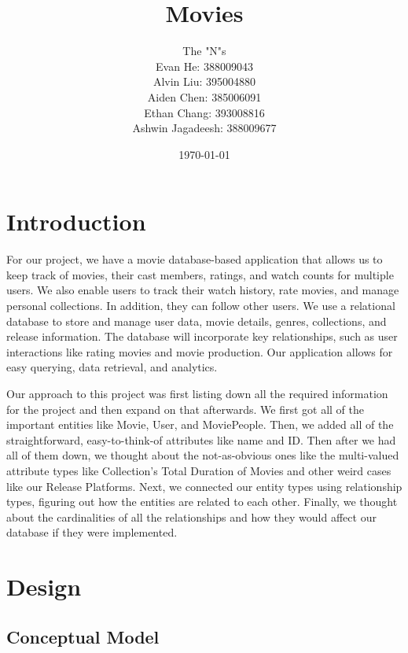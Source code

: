 \documentclass[12pt]{article}
\title{Movies}
\date{\today}
\author{The "N"s \\
        Evan He: 388009043\\
        Alvin Liu: 395004880\\
        Aiden Chen: 385006091\\
        Ethan Chang: 393008816\\
        Ashwin Jagadeesh: 388009677\\
        }
\begin{document}
\maketitle

\section{Introduction}

For our project, we have a movie database-based application that allows us to keep track of movies, their cast members, ratings, and watch counts for multiple users. We also enable users to track their watch history, rate movies, and manage personal collections. In addition, they can follow other users. We use a relational database to store and manage user data, movie details, genres, collections, and release information. The database will incorporate key relationships, such as user interactions like rating movies and movie production. Our application allows for easy querying, data retrieval, and analytics. 

Our approach to this project was first listing down all the required information for the project and then expand on that afterwards. We first got all of the important entities like Movie, User, and MoviePeople. Then, we added all of the straightforward, easy-to-think-of attributes like name and ID. Then after we had all of them down, we thought about the not-as-obvious ones like the multi-valued attribute types like Collection's Total Duration of Movies and other weird cases like our Release Platforms. Next, we connected our entity types using relationship types, figuring out how the entities are related to each other. Finally, we thought about the cardinalities of all the relationships and how they would affect our database if they were implemented. \\

\section{Design}
\subsection{Conceptual Model}
\end{document}
